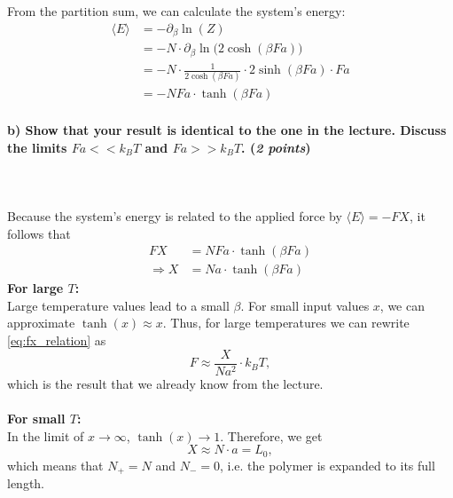     \noindent
    From the partition sum, we can calculate the system's energy:
    \begin{align}
        \langle E\rangle
        &=-\partial_\beta \ln(Z) \\
        &=-N\cdot\partial_\beta\ln\bigg(2\cosh(\beta Fa)\bigg) \\
        &=-N\cdot\frac{1}{2\cosh(\beta Fa)}\cdot 2\sinh(\beta Fa)\cdot Fa \\
        &=-NFa\cdot\tanh(\beta Fa)
    \end{align}

\newpage
\paragraph{b) Show that your result is identical to the one in the lecture.
    Discuss the limits $Fa<<k_BT$ and $Fa>>k_BT$. (\textit{2 points})
} \ \\
    \\
    Because the system's energy is related to the applied force by 
    $\langle E\rangle=-FX$, it follows that 
    \begin{align}
        FX
        &= NFa\cdot\tanh(\beta Fa) \\
        \Rightarrow X
        &= Na\cdot\tanh(\beta Fa)
        \label{eq:fx_relation}
    \end{align}
    \textbf{For large $T$:} \\
    Large temperature values lead to a small $\beta$.
    For small input values $x$, we can approximate $\tanh(x)\approx x$.
    Thus, for large temperatures we can rewrite \autoref{eq:fx_relation} as
    \begin{equation}
        F\approx \frac{X}{Na^2}\cdot k_BT,
    \end{equation}
    which is the result that we already know from the lecture. \\
    \\
    \textbf{For small $T$:} \\
    In the limit of $x\to\infty$, $\tanh(x)\to1$. Therefore, we get 
    \begin{equation}
        X\approx N\cdot a= L_0,
    \end{equation}
    which means that $N_+=N$ and $N_-=0$, i.e. the polymer is expanded to its 
    full length.

